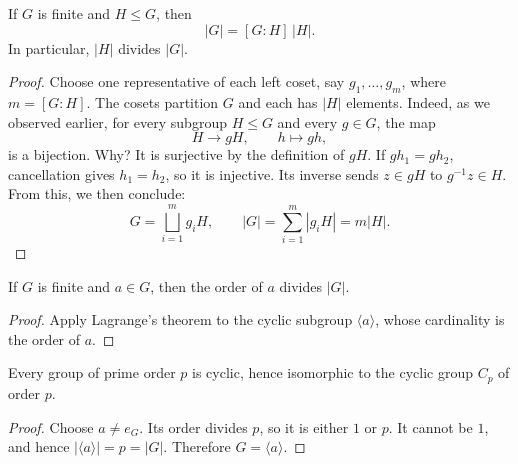 \documentclass[reqno,11pt]{amsart}
\begin{document}
\begin{theorem}[Lagrange]
If $G$ is finite and $H\leq G$, then
\begin{equation}
  |G|=[G:H]\,|H|.
\end{equation}
In particular, $|H|$ divides $|G|$.
\end{theorem}
\begin{proof}
Choose one representative of each left coset, say $g_1,\ldots,g_m$, where
$m=[G:H]$. The cosets partition $G$ and each has $|H|$ elements. Indeed, as we observed earlier, for every subgroup $H\leq G$ and every $g\in G$, the map
\[
H\longrightarrow gH,\qquad h\longmapsto gh,
\]
is a bijection. Why? It is surjective by the definition of $gH$. If $gh_1=gh_2$, cancellation
gives $h_1=h_2$, so it is injective. Its inverse sends $z\in gH$ to
$g^{-1}z\in H$.
From this, we then conclude:
\[
  G=\bigsqcup_{i=1}^m g_iH,
  \qquad |G|=\sum_{i=1}^m|g_iH|=m|H|.
\]
\end{proof}




\begin{corollary}
If $G$ is finite and $a\in G$, then the order of $a$ divides $|G|$.
\end{corollary}
\begin{proof}
Apply Lagrange's theorem to the cyclic subgroup $\langle a\rangle$, whose
cardinality is the order of $a$.
\end{proof}

\begin{corollary}
Every group of prime order $p$ is cyclic, hence isomorphic to the cyclic
group $C_p$ of order $p$.
\end{corollary}
\begin{proof}
Choose $a\neq e_G$. Its order divides $p$, so it is either $1$ or $p$.
It cannot be $1$, and hence $|\langle a\rangle|=p=|G|$. Therefore
$G=\langle a\rangle$.
\end{proof}
\end{document}
